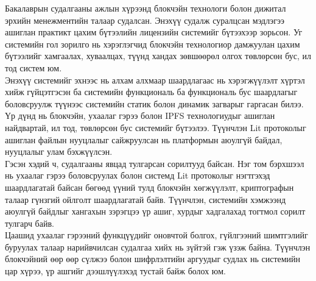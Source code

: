 \indent Бакалаврын судалгааны ажлын хүрээнд блокчэйн технологи болон дижитал эрхийн менежментийн талаар судалсан. Энэхүү судалж суралцсан мэдлэгээ ашиглан практикт цахим бүтээлийн лицензийн системийг бүтээхээр зорьсон. Уг системийн гол зорилго нь хэрэглэгчид блокчэйн технологиор дамжуулан цахим бүтээлийг хамгаалах, хуваалцах, түүнд хандах зөвшөөрөл олгох төвлөрсөн бус, ил тод систем юм.
\\ \indent Энэхүү системийг эхнээс нь алхам алхмаар шаардлагаас нь хэрэгжүүлэлт хүртэл хийж гүйцэтгэсэн ба системийн функциональ ба функциональ бус шаардлагыг боловсруулж түүнээс системийн статик болон динамик загварыг гаргасан билээ. Үр дүнд нь блокчэйн, ухаалаг гэрээ болон IPFS технологиудыг ашиглан найдвартай, ил тод, төвлөрсөн бус системийг бүтээлээ. Түүнчлэн Lit протоколыг ашиглан файлын нууцлалыг сайжруулсан нь платформын аюулгүй байдал, нууцлалыг улам бэхжүүлсэн.
\\ \indent Гэсэн хэдий ч, судалгааны явцад тулгарсан сорилтууд байсан. Нэг том бэрхшээл нь ухаалаг гэрээ боловсруулах болон системд Lit протоколыг нэгтгэхэд шаардлагатай байсан бөгөөд үүний тулд блокчэйн хөгжүүлэлт, криптографын талаар гүнзгий ойлголт шаардлагатай байв. Түүнчлэн, системийн хэмжээнд аюулгүй байдлыг хангахын зэрэгцээ үр ашиг, хурдыг хадгалахад тогтмол сорилт тулгарч байв.
\\ \indent  Цаашид ухаалаг гэрээний функцүүдийг оновчтой болгох, гүйлгээний шимтгэлийг буруулах талаар нарийвчилсан судалгаа хийх нь зүйтэй гэж үзэж байна. Түүнчлэн блокчэйний өөр өөр сүлжээ болон шифрлэлтийн аргуудыг судлах нь системийн цар хүрээ, үр ашгийг дээшлүүлэхэд тустай байж болох юм.